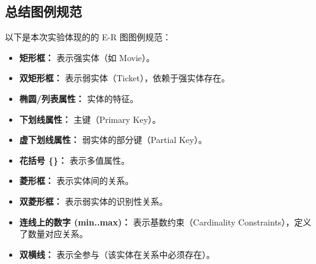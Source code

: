 \documentclass[a4paper]{article}
\begin{document}
\subsection{总结图例规范}
以下是本次实验体现的的 E-R 图图例规范：
\begin{itemize}
    \item \textbf{矩形框：} 表示强实体（如 Movie）。
    \item \textbf{双矩形框：} 表示弱实体（Ticket），依赖于强实体存在。
    \item \textbf{椭圆/列表属性：} 实体的特征。
    \item \textbf{下划线属性：} 主键（Primary Key）。
    \item \textbf{虚下划线属性：} 弱实体的部分键（Partial Key）。
    \item \textbf{花括号 \{\}：} 表示多值属性。
    \item \textbf{菱形框：} 表示实体间的关系。
    \item \textbf{双菱形框：} 表示弱实体的识别性关系。
    \item \textbf{连线上的数字 (min..max)：} 表示基数约束（Cardinality Constraints），定义了数量对应关系。
    \item \textbf{双横线：} 表示全参与（该实体在关系中必须存在）。
\end{itemize}
\end{document}

